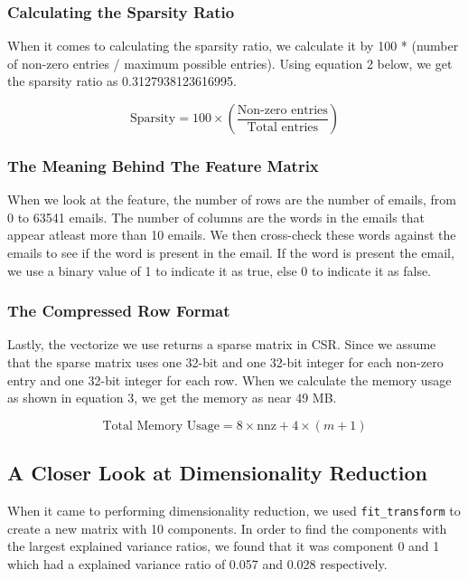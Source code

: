 \documentclass[a4paper, twocolumn]{article}
\begin{document}
\subsubsection{Calculating the Sparsity Ratio}
When it comes to calculating the sparsity ratio, we calculate it by 100 * (number of non-zero entries / maximum possible entries). Using equation 2 below, we
get the sparsity ratio as 0.3127938123616995.

\begin{equation}
    \text{Sparsity} = 100 \times \left(\frac{\text{Non-zero entries}}{\text{Total entries}} \right)
\end{equation}

\subsubsection{The Meaning Behind The Feature Matrix}
When we look at the feature, the number of rows are the number of emails, from 0 to 63541 emails. The number of columns are the words in the emails that appear
atleast more than 10 emails. We then cross-check these words against the emails to see if the word is present in the email. If the word is present the email,
we use a binary value of 1 to indicate it as true, else 0 to indicate it as false.

\subsubsection{The Compressed Row Format}
Lastly, the vectorize we use returns a sparse matrix in CSR. Since we assume that the sparse matrix uses one 32-bit and one 32-bit integer for each non-zero
entry and one 32-bit integer for each row. When we calculate the memory usage as shown in equation 3, we get the memory as near 49 MB.

\begin{equation}
    \text{Total Memory Usage} = 8 \times \text{nnz} + 4 \times (m + 1)
\end{equation}

\subsection{A Closer Look at Dimensionality Reduction}
When it came to performing dimensionality reduction, we used \texttt{fit\_transform} to create a new matrix with 10 components. In order to find the components
with the largest explained variance ratios, we found that it was component 0 and 1 which had a explained variance ratio of 0.057 and 0.028 respectively.
\end{document}

